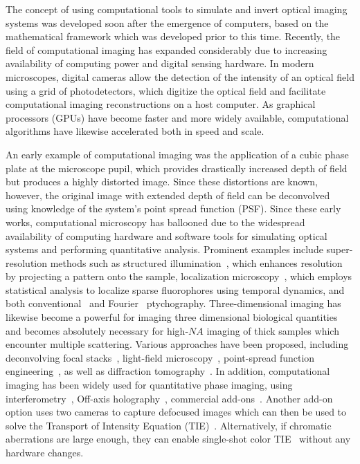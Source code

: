 The concept of using computational tools to simulate and invert optical imaging systems was developed soon after the emergence of computers, based on the mathematical framework which was developed prior to this time. Recently, the field of computational imaging has expanded considerably due to increasing availability of computing power and digital sensing hardware. In modern microscopes, digital cameras allow the detection of the intensity of an optical field using a grid of photodetectors, which digitize the optical field and facilitate computational imaging reconstructions on a host computer. As graphical processors (GPUs) have become faster and more widely available, computational algorithms have likewise accelerated both in speed and scale.

An early example of computational imaging was the application of a cubic phase plate at the microscope pupil, which provides drastically increased depth of field but produces a highly distorted image. Since these distortions are known, however, the original image with extended depth of field can be deconvolved using knowledge of the system's point spread function (PSF)\cite{Dowski:95}. Since these early works, computational microscopy has ballooned due to the widespread availability of computing hardware and software tools for simulating optical systems and performing quantitative analysis. Prominent examples include super-resolution methods such as structured illumination~\cite{gustafsson2000surpassing, gustafsson2005nonlinear}, which enhances resolution by projecting a pattern onto the sample, localization microscopy~\cite{betzig2006imaging, Rust:06}, which employs statistical analysis to localize sparse fluorophores using temporal dynamics, and both conventional~\cite{rodenburg2004phase} and Fourier~\cite{Zheng2013} ptychography. Three-dimensional imaging has likewise become a powerful for imaging three dimensional biological quantities and becomes absolutely necessary for high-$NA$ imaging of thick samples which encounter multiple scattering. Various approaches have been proposed, including deconvolving focal stacks~\cite{agard1984optical}, light-field microscopy~\cite{broxton2013wave, Ng2005}, point-spread function engineering~\cite{pavani2008three}, as well as diffraction tomography~\cite{wolf1969three, kim2014diffraction, maleki1992tomographic}. In addition, computational imaging has been widely used for quantitative phase imaging, using interferometry~\cite{Popescu2006,kim2014diffraction, Bhaduri:12}, Off-axis holography~\cite{Witte:12}, commercial add-ons~\cite{phasics,bon2012method}. Another add-on option uses two cameras to capture defocused images which can then be used to solve the Transport of Intensity Equation (TIE)~\cite{allman2005optical}. Alternatively, if chromatic aberrations are large enough, they can enable single-shot color TIE~\cite{wallerColorTIE} without any hardware changes.

